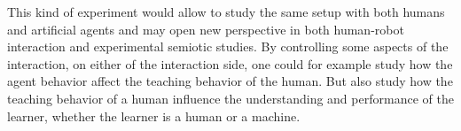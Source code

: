This kind of experiment would allow to study the same setup with both humans and artificial agents and may open new perspective in both human-robot interaction and experimental semiotic studies. By controlling some aspects of the interaction, on either of the interaction side, one could for example study how the agent behavior affect the teaching behavior of the human. But also study how the teaching behavior of a human influence the understanding and performance of the learner, whether the learner is a human or a machine. 




















